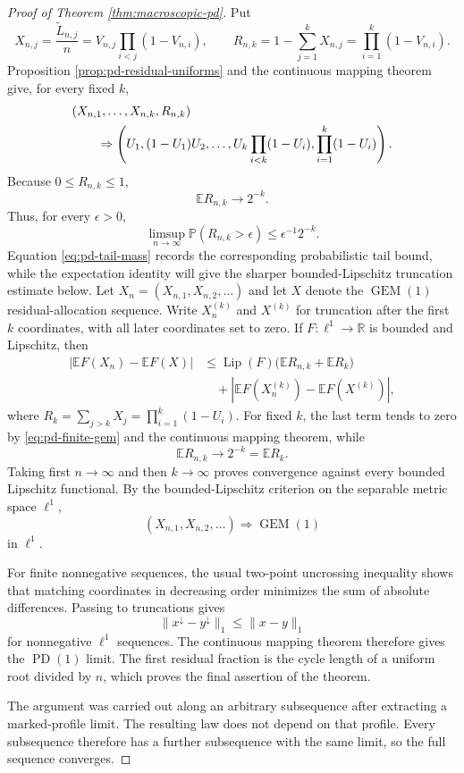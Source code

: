 \documentclass[11pt]{article}
\theoremstyle{remark}
\newcommand{\Pp}{\mathbb P}
\newcommand{\Ee}{\mathbb E}
\begin{document}
\begin{proof}[Proof of Theorem \ref{thm:macroscopic-pd}]
Put
\[
 X_{n,j}=\frac{\widetilde L_{n,j}}n
 =V_{n,j}\prod_{i<j}(1-V_{n,i}),
 \qquad
 R_{n,k}=1-\sum_{j=1}^kX_{n,j}
        =\prod_{i=1}^k(1-V_{n,i}).
\]
Proposition \ref{prop:pd-residual-uniforms} and the continuous mapping theorem
give, for every fixed $k$,
\begin{align}
 &(X_{n,1},\ldots,X_{n,k},R_{n,k})\notag\\
 &\qquad\Rightarrow
 \left(U_1,(1-U_1)U_2,\ldots,
 U_k\prod_{i<k}(1-U_i),\prod_{i=1}^k(1-U_i)\right).
 \label{eq:pd-finite-gem}
\end{align}
Because $0\le R_{n,k}\le1$,
\[
        \Ee R_{n,k}\longrightarrow2^{-k}.
\]
Thus, for every $\epsilon>0$,
\[
 \limsup_{n\to\infty}\Pp(R_{n,k}>\epsilon)
 \le\epsilon^{-1}2^{-k}.
 \label{eq:pd-tail-mass}
\]
Equation \eqref{eq:pd-tail-mass} records the corresponding probabilistic
tail bound, while the expectation identity will give the sharper
bounded-Lipschitz truncation estimate below.
Let $X_n=(X_{n,1},X_{n,2},\ldots)$ and let $X$ denote the
$\operatorname{GEM}(1)$ residual-allocation sequence.  Write $X_n^{(k)}$ and
$X^{(k)}$ for truncation after the first $k$ coordinates, with all later
coordinates set to zero.  If $F:\ell^1\to\mathbb R$ is bounded and Lipschitz,
then
\begin{align*}
 |\Ee F(X_n)-\Ee F(X)|
 &\le \operatorname{Lip}(F)
       \bigl(\Ee R_{n,k}+\Ee R_k\bigr)\\
 &\quad+
 |\Ee F(X_n^{(k)})-\Ee F(X^{(k)})|,
\end{align*}
where $R_k=\sum_{j>k}X_j=\prod_{i=1}^k(1-U_i)$.  For fixed $k$, the last
term tends to zero by \eqref{eq:pd-finite-gem} and the continuous mapping
theorem, while
\[
        \Ee R_{n,k}\longrightarrow2^{-k}=\Ee R_k.
\]
Taking first $n\to\infty$ and then $k\to\infty$ proves convergence against
every bounded Lipschitz functional.  By the bounded-Lipschitz criterion on the
separable metric space $\ell^1$,
\[
        (X_{n,1},X_{n,2},\ldots)
        \Rightarrow\operatorname{GEM}(1)
\]
in $\ell^1$.

For finite nonnegative sequences, the usual two-point uncrossing inequality
shows that matching coordinates in decreasing order minimizes the sum of
absolute differences.  Passing to truncations gives
\[
        \|x^\downarrow-y^\downarrow\|_1\le\|x-y\|_1
\]
for nonnegative $\ell^1$ sequences.  The continuous mapping theorem therefore
gives the $\operatorname{PD}(1)$ limit.  The first residual fraction is the
cycle length of a uniform root divided by $n$, which proves the final assertion
of the theorem.

The argument was carried out along an arbitrary subsequence after extracting a
marked-profile limit.  The resulting law does not depend on that profile.
Every subsequence therefore has a further subsequence with the same limit, so
the full sequence converges.
\end{proof}
\end{document}
